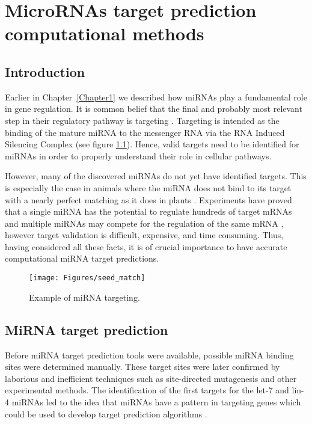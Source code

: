 
\chapter{MicroRNAs target prediction computational methods} %

\label{Chapter2} %



\section{Introduction}
Earlier in Chapter~\ref{Chapter1} we described how miRNAs play a fundamental role in gene regulation. It is common belief that the final and probably most relevant step in their regulatory pathway is targeting \cite{computational_methods}. Targeting is intended as the binding of the mature miRNA to the messenger RNA via the RNA Induced Silencing Complex (see figure \ref{fig:mirna_binding}). Hence, valid targets need to be identified for miRNAs in order to properly understand their role in cellular pathways. 

However, many of the discovered miRNAs do not yet have identified targets. This is especially the case in animals where the miRNA does not bind to its target with a nearly perfect matching as it does in plants \cite{perfect_matching}. Experiments have proved that a single miRNA has the potential to regulate hundreds of target mRNAs and multiple miRNAs may compete for the regulation of the same mRNA \cite{multiple_binds}, however target validation is difficult, expensive, and time consuming. Thus, having considered all these facts, it is of crucial importance to have accurate computational miRNA target predictions.

\begin{figure}[hbt!]
	\centering
	\texttt{[image: Figures/seed\_match]}
	\caption{Example of miRNA targeting.}
	\label{fig:mirna_binding}
\end{figure}


\section{MiRNA target prediction}
Before miRNA target prediction tools were available, possible miRNA binding sites were
determined manually. These target sites were later confirmed by laborious and inefficient techniques such as site-directed mutagenesis and other experimental methods. The identification of the first targets for the let-7 and lin-4 miRNAs led to the idea that miRNAs have a pattern in targeting genes which could be used to develop target prediction algorithms \cite{first_predictions}.

